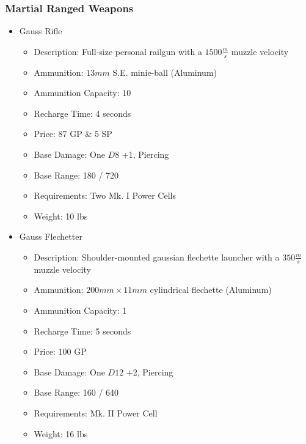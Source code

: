 \documentclass[12pt, landscape]{article}
\begin{document}
\begin{FlushLeft}
\begin{multicols}{2}
			\subsubsection{Martial Ranged Weapons}
			\begin{itemize}
				\item Gauss Rifle
				\begin{itemize}
					\item Description: Full-size personal railgun with a $1500 \frac{m}{s}$ muzzle velocity
					\item Ammunition: $13mm$ S.E. minie-ball (Aluminum)
					\item Ammunition Capacity: 10
					\item Recharge Time: 4 seconds
					\item Price: 87 GP \& 5 SP
					\item Base Damage: One $D8$ +1, Piercing
					\item Base Range: 180 / 720
					\item Requirements: Two Mk. I Power Cells
					\item Weight: 10 lbs
				\end{itemize}
				\item Gauss Flechetter
				\begin{itemize}
					\item Description: Shoulder-mounted gaussian flechette launcher with a $350 \frac{m}{s}$ muzzle velocity
					\item Ammunition: $200mm \times 11mm$ cylindrical flechette (Aluminum)
					\item Ammunition Capacity: 1
					\item Recharge Time: 5 seconds
					\item Price: 100 GP
					\item Base Damage: One $D12$ +2, Piercing
					\item Base Range: 160 / 640
					\item Requirements: Mk. II Power Cell
					\item Weight: 16 lbs
				\end{itemize}
			\end{itemize}
			\vfill \null \columnbreak


\end{multicols}
\end{FlushLeft}
\end{document}
